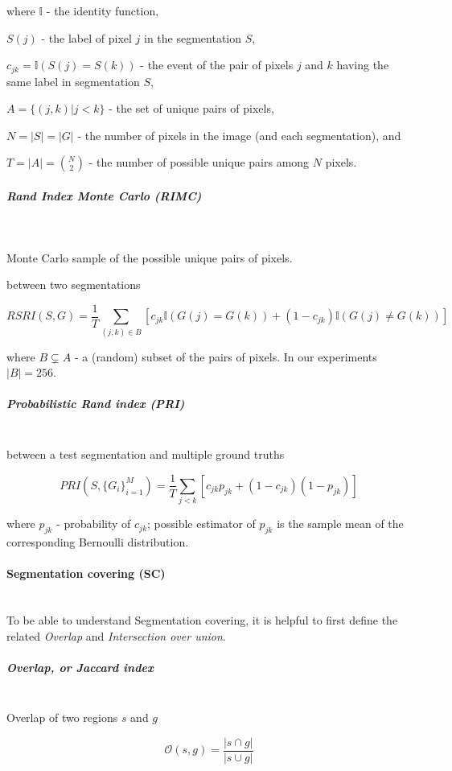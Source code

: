where $\mathbb{I}$ - the identity function,

$S(j)$ - the label of pixel $j$ in the segmentation $S$,

$c_{jk}=\mathbb{I}\left(S(j)=S(k)\right)$ - the event of the pair
of pixels $j$ and $k$ having the same label in segmentation $S$,

$A=\{(j,k)|j<k\}$ - the set of unique pairs of pixels,

$N=\left|S\right|=\left|G\right|$ - the number of pixels in the image
(and each segmentation), and 

$T=|A|=\binom{N}{2}$ - the number of possible unique pairs among
$N$ pixels.


\subparagraph*{Rand Index Monte Carlo (RIMC)}\mbox{}\\ %
\label{RIMC-maths}

Monte Carlo sample of the possible unique pairs of pixels.

between two segmentations

\[
RSRI(S,G)=\frac{1}{T}\sum\limits _{(j,k)\in B}\left[c_{jk}\mathbb{I}\left(G(j)=G(k)\right)+(1-c_{jk})\mathbb{I}\left(G(j)\neq G(k)\right)\right]
\]


where $B\subsetneq A$ - a (random) subset of the pairs of pixels.
In our experiments $|B|=256$.


\subparagraph*{Probabilistic Rand index (PRI)}\mbox{}\\
between a test segmentation and multiple ground truths

\[
PRI(S,\{G_{i}\}_{i=1}^{M})=\frac{1}{T}\sum\limits _{j<k}\left[c_{jk}p_{jk}+\left(1-c_{jk}\right)\left(1-p_{jk}\right)\right]
\]


where $p_{jk}$ - probability of $c_{jk}$; possible estimator of
$p_{jk}$ is the sample mean of the corresponding Bernoulli distribution.


\paragraph{Segmentation covering (SC)}\mbox{}\\
To be able to understand Segmentation covering, it is helpful to first define the related \textit{Overlap} and \textit{Intersection over union}.

\subparagraph*{Overlap, or Jaccard index}\mbox{}\\
Overlap of two regions $s$ and $g$

\[
\mathcal{O}\left(s,g\right)=\frac{\left|s\cap g\right|}{\left|s\cup g\right|}
\]

